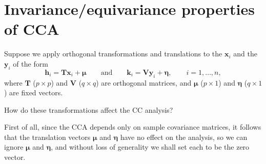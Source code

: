 \documentclass[]{book}
\theoremstyle{definition}
\theoremstyle{definition}
\theoremstyle{definition}
\theoremstyle{remark}
\begin{document}
\hypertarget{invarianceequivariance-properties-of-cca}{%
\section{Invariance/equivariance properties of CCA}\label{invarianceequivariance-properties-of-cca}}

Suppose we apply orthogonal transformations and translations to the \(\boldsymbol x_i\) and the \(\boldsymbol y_i\) of the form
\begin{equation}
{\mathbf h}_i={\mathbf T}\boldsymbol x_i + {\pmb \mu} \qquad \text{and} \qquad {\mathbf k}_i={\mathbf V}\boldsymbol y_i +{\pmb \eta},
\qquad i=1,\ldots , n,
\label{eq:transformations}
\end{equation}
where \(\mathbf T\) (\(p \times p\)) and \(\mathbf V\) (\(q \times q\)) are orthogonal matrices, and \(\pmb \mu\) (\(p \times 1\)) and
\(\pmb \eta\) (\(q \times 1\)) are fixed vectors.

How do these transformations affect the CC analysis?

First of all, since the CCA depends only on sample covariance matrices, it follows that the translation vectors \(\pmb \mu\) and \(\pmb \eta\) have no effect on the analysis, so we can ignore \(\pmb \mu\) and \(\pmb \eta\), and without loss of generality we shall set each to be the zero vector.
\end{document}
